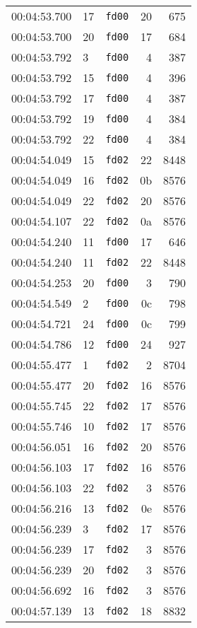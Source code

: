 \documentclass{article}
\begin{document}
\begin{longtable}{lllrr}
00:04:53.700 & 17 & \texttt{fd00} & 20 & 675 \\
00:04:53.700 & 20 & \texttt{fd00} & 17 & 684 \\
00:04:53.792 & 3 & \texttt{fd00} & 4 & 387 \\
00:04:53.792 & 15 & \texttt{fd00} & 4 & 396 \\
00:04:53.792 & 17 & \texttt{fd00} & 4 & 387 \\
00:04:53.792 & 19 & \texttt{fd00} & 4 & 384 \\
00:04:53.792 & 22 & \texttt{fd00} & 4 & 384 \\
00:04:54.049 & 15 & \texttt{fd02} & 22 & 8448 \\
00:04:54.049 & 16 & \texttt{fd02} & 0b & 8576 \\
00:04:54.049 & 22 & \texttt{fd02} & 20 & 8576 \\
00:04:54.107 & 22 & \texttt{fd02} & 0a & 8576 \\
00:04:54.240 & 11 & \texttt{fd00} & 17 & 646 \\
00:04:54.240 & 11 & \texttt{fd02} & 22 & 8448 \\
00:04:54.253 & 20 & \texttt{fd00} & 3 & 790 \\
00:04:54.549 & 2 & \texttt{fd00} & 0c & 798 \\
00:04:54.721 & 24 & \texttt{fd00} & 0c & 799 \\
00:04:54.786 & 12 & \texttt{fd00} & 24 & 927 \\
00:04:55.477 & 1 & \texttt{fd02} & 2 & 8704 \\
00:04:55.477 & 20 & \texttt{fd02} & 16 & 8576 \\
00:04:55.745 & 22 & \texttt{fd02} & 17 & 8576 \\
00:04:55.746 & 10 & \texttt{fd02} & 17 & 8576 \\
00:04:56.051 & 16 & \texttt{fd02} & 20 & 8576 \\
00:04:56.103 & 17 & \texttt{fd02} & 16 & 8576 \\
00:04:56.103 & 22 & \texttt{fd02} & 3 & 8576 \\
00:04:56.216 & 13 & \texttt{fd02} & 0e & 8576 \\
00:04:56.239 & 3 & \texttt{fd02} & 17 & 8576 \\
00:04:56.239 & 17 & \texttt{fd02} & 3 & 8576 \\
00:04:56.239 & 20 & \texttt{fd02} & 3 & 8576 \\
00:04:56.692 & 16 & \texttt{fd02} & 3 & 8576 \\
00:04:57.139 & 13 & \texttt{fd02} & 18 & 8832 \\

\end{longtable}
\end{document}
